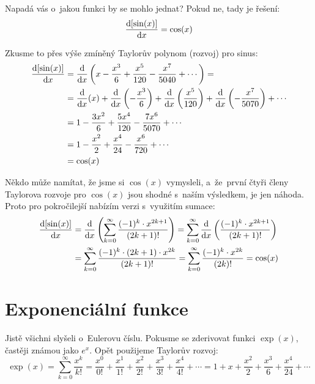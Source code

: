 Napadá vás o~jakou funkci by se mohlo jednat? Pokud ne, tady je řešení:
\begin{equation*}
    \frac{\mathrm{d} [\sin(x)]}{\mathrm{d} x} = \cos(x)
\end{equation*}

Zkusme to přes výše zmíněný Taylorův polynom (rozvoj) pro sinus:
\begin{align*}
    \frac{\mathrm{d} [\sin(x)]}{\mathrm{d} x}
    &= \frac{\mathrm{d}}{\mathrm{d} x} \left(x - \frac{x^3}{6} + \frac{x^5}{120} - \frac{x^7}{5040} + \cdots \right) = \\
    &= \frac{\mathrm{d}}{\mathrm{d} x} (x)
    + \frac{\mathrm{d}}{\mathrm{d} x} \left(-\frac{x^3}{6}\right)
    + \frac{\mathrm{d}}{\mathrm{d} x} \left(\frac{x^5}{120}\right)
    + \frac{\mathrm{d}}{\mathrm{d} x} \left(-\frac{x^7}{5070}\right)
    + \cdots \\
    &= 1 - \frac{3x^2}{6} + \frac{5x^4}{120} - \frac{7x^6}{5070} + \cdots \\
    &= 1 - \frac{x^2}{2} + \frac{x^4}{24} - \frac{x^6}{720} + \cdots \\
    &= \cos(x)
\end{align*}

Někdo může namítat, že jsme si $\cos(x)$ vymysleli, a~že~první čtyři členy Taylorova
rozvoje pro $\cos(x)$ jsou shodné s~naším výsledkem, je jen náhoda. Proto pro pokročilejší nabízím verzi s~využitím sumace:
\begin{align*}
    \frac{\mathrm{d} [\sin(x)]}{\mathrm{d} x}
    &= \frac{\mathrm{d}}{\mathrm{d} x} \left( \sum_{k=0}^{\infty} \frac{(-1)^k \cdot x^{2k + 1}}{(2k + 1)!} \right)
    = \sum_{k=0}^{\infty} \frac{\mathrm{d}}{\mathrm{d} x} \left( \frac{(-1)^k \cdot x^{2k + 1}}{(2k + 1)!} \right) \\
    &= \sum_{k=0}^{\infty} \frac{(-1)^k \cdot (2k+1) \cdot  x^{2k}}{(2k+1)!}
    = \sum_{k=0}^{\infty} \frac{(-1)^k \cdot  x^{2k}}{(2k)!}
    = \cos(x)
\end{align*}

\section{Exponenciální funkce}

Jistě všichni slyšeli o~Eulerovu číslu. Pokusme se zderivovat funkci $\exp(x)$, častěji známou jako $e^x$. Opět použijeme Taylorův rozvoj:
\begin{equation*}
    \exp(x) = \sum_{k=0}^{\infty} \frac{x^k}{k!}
    = \frac{x^0}{0!} + \frac{x^1}{1!} + \frac{x^2}{2!} + \frac{x^3}{3!} + \frac{x^4}{4!} + \cdots
    = 1 + x + \frac{x^2}{2} + \frac{x^3}{6} + \frac{x^4}{24} + \cdots
\end{equation*}
